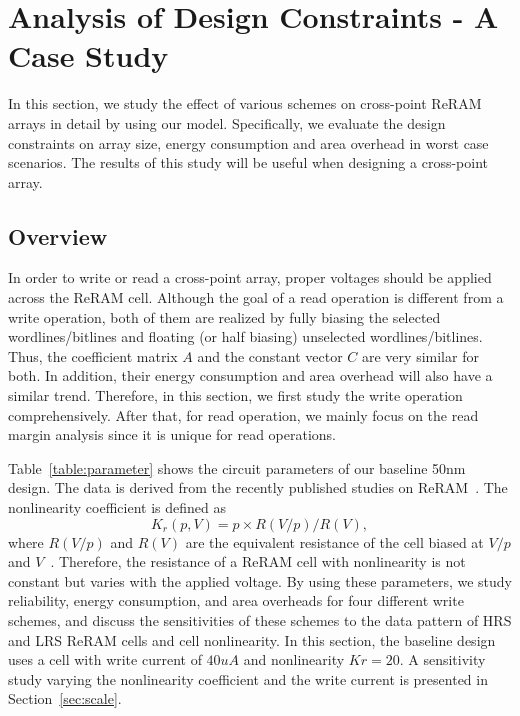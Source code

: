 \vspace{-4pt}
\section{Analysis of Design Constraints - A Case Study}\label{sec:w_and_r}

In this section, we study the effect of various schemes on cross-point
ReRAM arrays in detail by using our model. Specifically, we
evaluate the design constraints on array size, energy consumption and area overhead in worst case scenarios. The results of this study will be useful when designing a cross-point array.

\vspace{-10pt}
\subsection{Overview}
In order to write or read a cross-point array, proper voltages should be
applied across the ReRAM cell. Although the goal of a read operation is
different from a write operation, both of them are realized by fully
biasing the selected wordlines/bitlines and floating (or half biasing)
unselected wordlines/bitlines. Thus, the coefficient matrix $A$ and the
constant vector $C$ are very similar for both. In addition, their energy
consumption and area overhead will also have a similar trend. Therefore,
in this section, we first study the write operation comprehensively. After
that, for read operation, we mainly focus on the read margin analysis
since it is unique for read operations.

Table~\ref{table:parameter} shows the circuit parameters of our baseline
50nm design. The data is derived from the recently published studies on
ReRAM~\cite{ReRAM_overview,memristor:Cong,ReRAM_Renesas}. The nonlinearity
coefficient is defined as
\begin{equation}
K_r(p,V) = p \times R(V/p)/R(V),
\end{equation}
where $R(V/p)$ and $R(V)$ are the equivalent resistance of the cell biased
at $V/p$ and $V$~\cite{memristor:Cong}. Therefore, the resistance of a
ReRAM cell with nonlinearity is not constant but varies with the applied
voltage. By using these parameters, we study reliability, energy
consumption, and area overheads for four different write schemes, and
discuss the sensitivities of these schemes to the data pattern of HRS and
LRS ReRAM cells and cell nonlinearity. In this section, the baseline
design uses a cell with write current of $40 uA$ and nonlinearity
$Kr=20$. A sensitivity study varying the nonlinearity
coefficient and the write current is presented in Section~\ref{sec:scale}.

